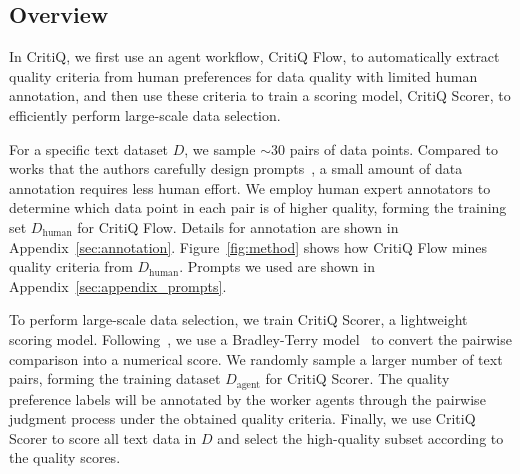 \subsection{Overview}

In CritiQ, we first use an agent workflow, CritiQ Flow, to automatically extract
quality criteria from human preferences for data quality with limited human
annotation, and then use these criteria to train a scoring model, CritiQ Scorer,
to efficiently perform large-scale data selection.

For a specific text dataset $D$, we sample $\sim$30 pairs of data points. Compared to
works that the authors carefully design prompts~\citep{dubey_llama_2024, sachdeva_how_2024,zhang_autonomous_2024,gunasekar_textbooks_2023, wei_arctic-snowcoder_2024},
a small amount of data annotation requires less human effort. We employ human expert
annotators to determine which data point in each pair is of higher quality,
forming the training set $D_{\text{human}}$ for CritiQ Flow. Details for annotation
are shown in Appendix~\ref{sec:annotation}. Figure~\ref{fig:method} shows how
CritiQ Flow mines quality criteria from $D_{\text{human}}$. Prompts we used are shown
in Appendix~\ref{sec:appendix_prompts}.

To perform large-scale data selection, we train CritiQ Scorer, a lightweight scoring
model. Following~\citet{korbak_pretraining_2023,wettig_qurating_2024}, we use a
Bradley-Terry model~\citep{bradley_rank_1952} to convert the pairwise comparison
into a numerical score. We randomly sample a larger number of text pairs, forming
the training dataset $D_{\text{agent}}$ for CritiQ Scorer. The quality
preference labels will be annotated by the worker agents through the pairwise
judgment process under the obtained quality criteria. Finally, we use CritiQ
Scorer to score all text data in $D$ and select the high-quality subset
according to the quality scores.

